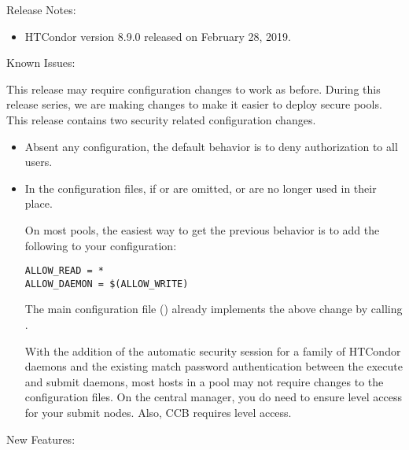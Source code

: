 \noindent Release Notes:

\begin{itemize}

\item HTCondor version 8.9.0 released on February 28, 2019.

\end{itemize}

\noindent Known Issues:

This release may require configuration changes to work as before.
During this release series, we are making changes to make it easier to deploy
secure pools. This release contains two security related configuration changes.

\begin{itemize}

\item Absent any configuration, the default behavior is to deny authorization
to all users.

\item In the configuration files, if  or
 are omitted,  or
 are no longer used in their place.

On most pools, the easiest way to get the previous behavior is to add the
following to your configuration:

\begin{verbatim}
ALLOW_READ = *
ALLOW_DAEMON = $(ALLOW_WRITE)
\end{verbatim}

The main configuration file () already
implements the above change by calling .

With the addition of the automatic security session for a family of HTCondor
daemons and the existing match password authentication between the execute
and submit daemons, most hosts in a pool may not require changes to the
configuration files.
On the central manager, you do need to ensure  level access
for your submit nodes.
Also, CCB requires  level access.

\end{itemize}

\noindent New Features:

